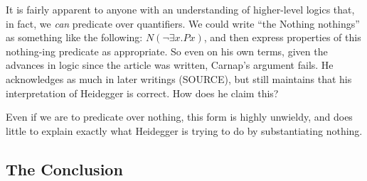 \documentclass[leqno, 12pt]{turabian-researchpaper}
\begin{document}
	It is fairly apparent to anyone with an understanding of higher-level logics
	that, in fact, we \emph{can} predicate over quantifiers. We could write
	\enquote{the Nothing nothings} as something like the following:
	$N(\neg\exists x . Px)$, and then express properties of this nothing-ing predicate
	as appropriate. So even on his own terms, given the advances in logic since the
	article was written, Carnap's argument fails. He acknowledges as much in later
	writings (SOURCE), but still maintains that his interpretation of Heidegger is
	correct. How does he claim this?

	Even if we are to predicate over nothing, this form is highly unwieldy, and does
	little to explain exactly what Heidegger is trying to do by substantiating nothing.

	\subsection{The Conclusion}

	\clearpage
	\printbibliography
\end{document}
